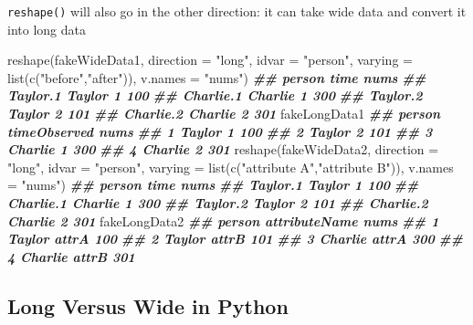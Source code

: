 \documentclass[
  12pt,
  krantz2]{krantz}
\makeatletter
\newenvironment{Shaded}{\begin{snugshade}}{\end{snugshade}}
\newcommand{\AttributeTok}[1]{\textcolor[rgb]{0.61,0.61,0.61}{#1}}
\newcommand{\DocumentationTok}[1]{\textcolor[rgb]{0.37,0.37,0.37}{\textbf{\textit{#1}}}}
\newcommand{\FunctionTok}[1]{\textcolor[rgb]{0,0,0}{#1}}
\newcommand{\NormalTok}[1]{#1}
\newcommand{\StringTok}[1]{\textcolor[rgb]{0.5,0.5,0.5}{#1}}
\newenvironment{kframe}{%
\medskip{}
\setlength{\fboxsep}{.8em}
 \def\at@end@of@kframe{}%
 \ifinner\ifhmode%
  \def\at@end@of@kframe{\end{minipage}}%
  \begin{minipage}{\columnwidth}%
 \fi\fi%
 \def\FrameCommand##1{\hskip\@totalleftmargin \hskip-\fboxsep
 \colorbox{shadecolor}{##1}\hskip-\fboxsep
     \hskip-\linewidth \hskip-\@totalleftmargin \hskip\columnwidth}%
 \MakeFramed {\advance\hsize-\width
   \@totalleftmargin\z@ \linewidth\hsize
   \@setminipage}}%
 {\par\unskip\endMakeFramed%
 \at@end@of@kframe}
\renewenvironment{Shaded}{\begin{kframe}}{\end{kframe}}
\makeatother
\begin{document}
\texttt{reshape()} will also go in the other direction: it can take wide data and convert it into long data

\begin{Shaded}
\begin{Highlighting}[]
\FunctionTok{reshape}\NormalTok{(fakeWideData1, }
        \AttributeTok{direction =} \StringTok{"long"}\NormalTok{,}
        \AttributeTok{idvar =} \StringTok{"person"}\NormalTok{, }
        \AttributeTok{varying =} \FunctionTok{list}\NormalTok{(}\FunctionTok{c}\NormalTok{(}\StringTok{"before"}\NormalTok{,}\StringTok{"after"}\NormalTok{)),}
        \AttributeTok{v.names =} \StringTok{"nums"}\NormalTok{)}
\DocumentationTok{\#\#            person time nums}
\DocumentationTok{\#\# Taylor.1   Taylor    1  100}
\DocumentationTok{\#\# Charlie.1 Charlie    1  300}
\DocumentationTok{\#\# Taylor.2   Taylor    2  101}
\DocumentationTok{\#\# Charlie.2 Charlie    2  301}
\NormalTok{fakeLongData1}
\DocumentationTok{\#\#    person timeObserved nums}
\DocumentationTok{\#\# 1  Taylor            1  100}
\DocumentationTok{\#\# 2  Taylor            2  101}
\DocumentationTok{\#\# 3 Charlie            1  300}
\DocumentationTok{\#\# 4 Charlie            2  301}
\FunctionTok{reshape}\NormalTok{(fakeWideData2, }
        \AttributeTok{direction =} \StringTok{"long"}\NormalTok{,}
        \AttributeTok{idvar =} \StringTok{"person"}\NormalTok{, }
        \AttributeTok{varying =} \FunctionTok{list}\NormalTok{(}\FunctionTok{c}\NormalTok{(}\StringTok{"attribute A"}\NormalTok{,}\StringTok{"attribute B"}\NormalTok{)),}
        \AttributeTok{v.names =} \StringTok{"nums"}\NormalTok{)}
\DocumentationTok{\#\#            person time nums}
\DocumentationTok{\#\# Taylor.1   Taylor    1  100}
\DocumentationTok{\#\# Charlie.1 Charlie    1  300}
\DocumentationTok{\#\# Taylor.2   Taylor    2  101}
\DocumentationTok{\#\# Charlie.2 Charlie    2  301}
\NormalTok{fakeLongData2}
\DocumentationTok{\#\#    person attributeName nums}
\DocumentationTok{\#\# 1  Taylor         attrA  100}
\DocumentationTok{\#\# 2  Taylor         attrB  101}
\DocumentationTok{\#\# 3 Charlie         attrA  300}
\DocumentationTok{\#\# 4 Charlie         attrB  301}
\end{Highlighting}
\end{Shaded}

\hypertarget{long-versus-wide-in-python}{%
\subsection{Long Versus Wide in Python}\label{long-versus-wide-in-python}}
\end{document}
